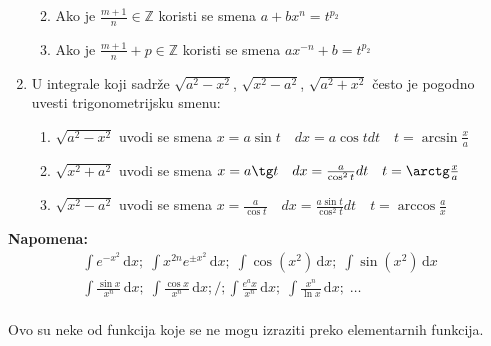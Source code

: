 \begin{enumerate}[label = \textbf{\arabic*.)}]
\begin{enumerate}[label = \Roman*]
\begin{enumerate}[label = \alph*)]
					\end{enumerate}
				\item
					Ako je $\frac{m+1}{n}\in \mathbb{Z}$ koristi se smena  $a+bx^n=t^{p_2}$
				\item
					Ako je $\frac{m+1}{n}+p \in \mathbb{Z}$ koristi se smena $ax^{-n}+b=t^{p_2}$
			\end{enumerate}
		\item
			U integrale koji sadrže $\sqrt{a^2-x^2}$, $\sqrt{x^2-a^2}$, $\sqrt{a^2+x^2}$ često je pogodno uvesti trigonometrijsku smenu:
			\begin{enumerate}[label = \alph*)]
				\item 
					$\sqrt{a^2-x^2}$ uvodi se smena $x = a \sin t\quad dx = a \cos t dt \quad t = \arcsin \frac{x}{a}$
				\item
					$\sqrt{x^2+a^2}$ uvodi se smena $x = a \tg t \quad dx = \frac{a}{\cos^2 t}dt \quad t = \arctg \frac{x}{a}$
				\item 
					$\sqrt{x^2-a^2}$ uvodi se smena $x = \frac{a}{\cos t} \quad dx = \frac{a \sin t}{\cos^2 t}dt \quad t = \arccos \frac{a}{x}$
			\end{enumerate}
	\end{enumerate}

	\textbf{Napomena:} \begin{gather*}
		\int e^{-x^2}\, \mathrm{d}x; \; \int x^{2n}e^{\pm x^2}\, \mathrm{d}x; \; \int \cos (x^2) \, \mathrm{d}x; \; \int \sin(x^2) \, \mathrm{d}x \\
 		\int \frac{\sin x}{x^n} \, \mathrm{d}x; \; \int \frac{\cos x}{x^n}\, \mathrm{d}x;/; \int \frac{e^ax}{x^n}\, \mathrm{d}x ;\; \int \frac{x^n}{\ln x}\, \mathrm{d}x;\; \ldots
	\end{gather*}\\
	Ovo su neke od funkcija koje se ne mogu izraziti preko elementarnih funkcija.
	
